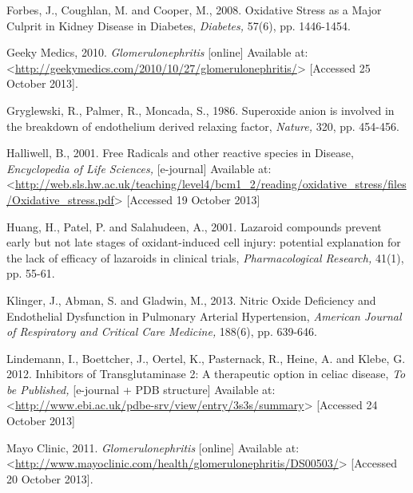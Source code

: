 \documentclass[12pt]{report}
\begin{document}
Forbes, J., Coughlan, M. and Cooper, M., 2008. Oxidative Stress as a Major Culprit in Kidney Disease in Diabetes, \textit{Diabetes,} 57(6), pp. 1446-1454.
\newline
\newline

Geeky Medics, 2010. \textit{Glomerulonephritis} [online] Available at: <\url{http://geekymedics.com/2010/10/27/glomerulonephritis/}> [Accessed 25 October 2013].
\newline
\newline

Gryglewski, R., Palmer, R., Moncada, S., 1986. Superoxide anion is involved in the break­down of endothelium derived relaxing factor, \textit{Nature,} 320, pp. 454-456.
\newline
\newline

Halliwell, B., 2001. Free Radicals and other reactive species in Disease, \textit{Encyclopedia of Life Sciences,} [e-journal] Available at:<\url{http://web.sls.hw.ac.uk/teaching/level4/bcm1_2/reading/oxidative_stress/files/Oxidative_stress.pdf}> [Accessed 19 October 2013]
\newline
\newline

Huang, H., Patel, P. and Salahudeen, A., 2001. Lazaroid compounds prevent early but not late stages of oxidant-induced cell injury: potential explanation for the lack of efficacy of lazaroids in clinical trials, \textit{Pharmacological Research,} 41(1), pp. 55-61.
\newline
\newline

Klinger, J., Abman, S. and Gladwin, M., 2013. Nitric Oxide Deficiency and Endothelial Dysfunction in Pulmonary Arterial Hypertension, \textit{American Journal of Respiratory and Critical Care Medicine,} 188(6), pp. 639-646.
\newline
\newline

Lindemann, I., Boettcher, J., Oertel, K., Pasternack, R., Heine, A. and Klebe, G. 2012. Inhibitors of Transglutaminase 2: A therapeutic option in celiac disease, \textit{To be Published,} [e-journal + PDB structure] Available at:<\url{http://www.ebi.ac.uk/pdbe-srv/view/entry/3s3s/summary}> [Accessed 24 October 2013]
\newline
\newline

Mayo Clinic, 2011. \textit{Glomerulonephritis} [online] Available at: <\url{http://www.mayoclinic.com/health/glomerulonephritis/DS00503/}> [Accessed 20 October 2013].
\newline
\newline
\end{document}
